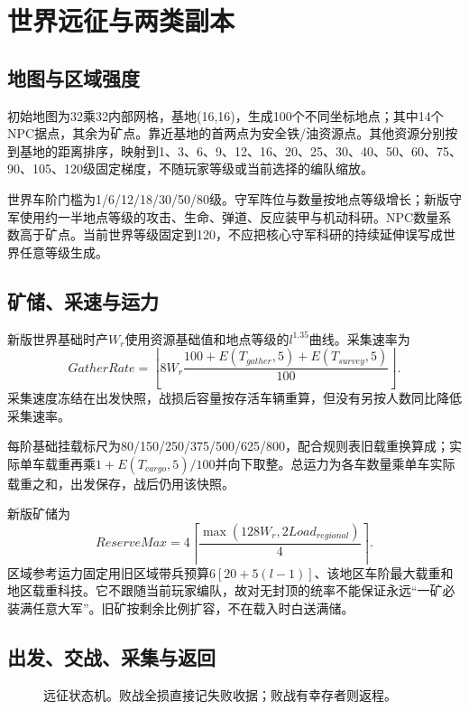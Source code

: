 \chapter{世界远征与两类副本}
\section{地图与区域强度}
初始地图为32乘32内部网格，基地(16,16)，生成100个不同坐标地点；其中14个NPC据点，其余为矿点。靠近基地的首两点为安全铁/油资源点。其他资源分别按到基地的距离排序，映射到1、3、6、9、12、16、20、25、30、40、50、60、75、90、105、120级固定梯度，不随玩家等级或当前选择的编队缩放。

世界车阶门槛为1/6/12/18/30/50/80级。守军阵位与数量按地点等级增长；新版守军使用约一半地点等级的攻击、生命、弹道、反应装甲与机动科研。NPC数量系数高于矿点。当前世界等级固定到120，不应把核心守军科研的持续延伸误写成世界任意等级生成。

\section{矿储、采速与运力}
新版世界基础时产\(W_r\)使用资源基础值和地点等级的\(l^{1.35}\)曲线。采集速率为
\[
GatherRate=\left\lfloor8W_r\frac{100+E(T_{gather},5)+E(T_{survey},5)}{100}\right\rfloor.
\]
采集速度冻结在出发快照，战损后容量按存活车辆重算，但没有另按人数同比降低采集速率。

每阶基础挂载标尺为80/150/250/375/500/625/800，配合规则表旧载重换算成；实际单车载重再乘\(1+E(T_{cargo},5)/100\)并向下取整。总运力为各车数量乘单车实际载重之和，出发保存，战后仍用该快照。

新版矿储为
\[
ReserveMax=4\left\lceil\frac{\max(128W_r,2Load_{regional})}{4}\right\rceil.
\]
区域参考运力固定用旧区域带兵预算\(6[20+5(l-1)]\)、该地区车阶最大载重和地区载重科技。它不跟随当前玩家编队，故对无封顶的统率不能保证永远“一矿必装满任意大军”。旧矿按剩余比例扩容，不在载入时白送满储。

\section{出发、交战、采集与返回}
\begin{figure}[htbp]\centering
{}
\caption{远征状态机。败战全损直接记失败收据；败战有幸存者则返程。}
\end{figure}

